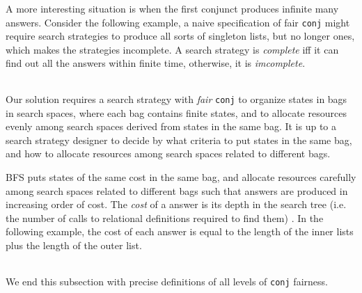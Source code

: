 \documentclass[format=acmlarge, review=true, authordraft=true]{acmart}
\newcommand{\conj}{\texttt{conj}}
\begin{document}
\begin{center}
	\begin{tabular}{c}
		
	\end{tabular}
\end{center}

A more interesting situation is when the first conjunct produces infinite many 
answers. Consider the following example, a naive specification of fair \conj{} 
might require search strategies to produce all sorts of singleton lists, but no 
longer ones, which makes the strategies incomplete. A search strategy is 
\emph{complete} iff it can find out all the answers within finite time, 
otherwise, 
it is \emph{imcomplete}.

\begin{center}
	\begin{tabular}{c}
		
	\end{tabular}
\end{center}

Our solution requires a search strategy with \emph{fair} \conj{} to organize
states in bags in search spaces, where each bag contains finite states, and 
to allocate resources evenly among search spaces derived from states in the 
same bag. It is up to a search strategy designer to decide by what criteria to 
put states in the same bag, and how to allocate resources among search spaces 
related to different bags.

BFS puts states of the same cost in the same bag, and allocate resources 
carefully among search spaces related to different bags such that answers are 
produced in increasing order of cost. The \emph{cost} of a answer is its depth 
in the search tree (i.e. the number of calls to relational definitions required 
to find them) \citet{seres1999algebra}. In the following example, the cost of 
each answer is equal to the length of the inner lists plus the length of the 
outer list. 

\begin{center}
	\begin{tabular}{c}
		
	\end{tabular}
\end{center}

We end this subsection with precise definitions of all levels of \conj{} 
fairness. 

\end{document}
